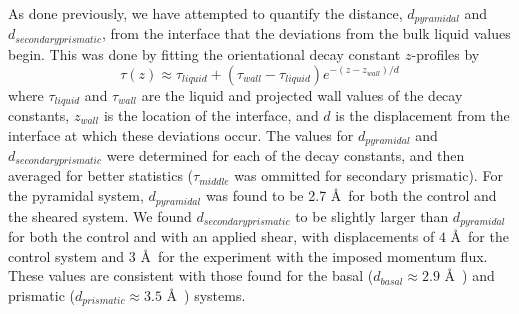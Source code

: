 \documentclass{pnastwo}
\begin{document}
\begin{article}
As done previously, we have attempted to quantify the distance, $d_{pyramidal}$
and $d_{secondary prismatic}$, from the 
interface that the deviations from the bulk liquid values begin. This was done
by fitting the orientational decay constant $z$-profiles by
\begin{equation}\label{tauFit}
\tau(z)\approx\tau_{liquid}+(\tau_{wall}-\tau_{liquid})e^{-(z-z_{wall})/d}
\end{equation}
where $\tau_{liquid}$ and $\tau_{wall}$ are the liquid and projected wall
values of the decay constants, $z_{wall}$ is the location of the interface,
and $d$ is the displacement from the interface at which these deviations
occur. The values for $d_{pyramidal}$ and $d_{secondary prismatic}$ were 
determined
for each of the decay constants, and then averaged for better statistics 
($\tau_{middle}$ was ommitted for secondary prismatic). For the pyramidal 
system,
$d_{pyramidal}$ was found to be 2.7 \AA\ for both the control and the sheared
system. We found $d_{secondary prismatic}$ to be slightly larger than 
$d_{pyramidal}$ for both the control and with an applied shear, with 
displacements of $4$ \AA\ for the control system and $3$ \AA\ for the 
experiment with the imposed momentum flux. These values are consistent with
those found for the basal ($d_{basal}\approx2.9$ \AA\ ) and prismatic 
($d_{prismatic}\approx3.5$ \AA\ ) systems.


\end{article}
\end{document}
